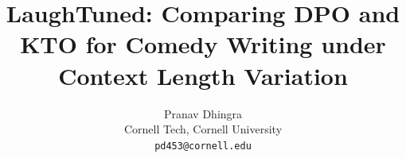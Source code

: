 \documentclass[10pt,twocolumn,letterpaper]{article}
\title{LaughTuned: Comparing DPO and KTO for Comedy Writing under Context Length Variation}
\author{Pranav Dhingra\\
Cornell Tech, Cornell University\\
{\tt\small pd453@cornell.edu}
}
\begin{document}
\maketitle





{
    \small
    
    
}

\end{document}
